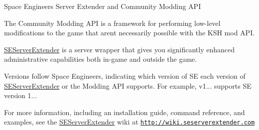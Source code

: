 Space Engineers Server Extender and Community Modding A\+P\+I

The Community Modding A\+P\+I is a framework for performing low-\/level modifications to the game that aren\textquotesingle{}t necessarily possible with the K\+S\+H mod A\+P\+I.

\hyperlink{namespace_s_e_server_extender}{S\+E\+Server\+Extender} is a server wrapper that gives you significantly enhanced administrative capabilities both in-\/game and outside the game.

Versions follow Space Engineers, indicating which version of S\+E each version of \hyperlink{namespace_s_e_server_extender}{S\+E\+Server\+Extender} or the Modding A\+P\+I supports. For example, v1... supports S\+E version 1...

For more information, including an installation guide, command reference, and examples, see the \hyperlink{namespace_s_e_server_extender}{S\+E\+Server\+Extender} wiki at \href{http://wiki.seserverextender.com}{\tt http\+://wiki.\+seserverextender.\+com} 